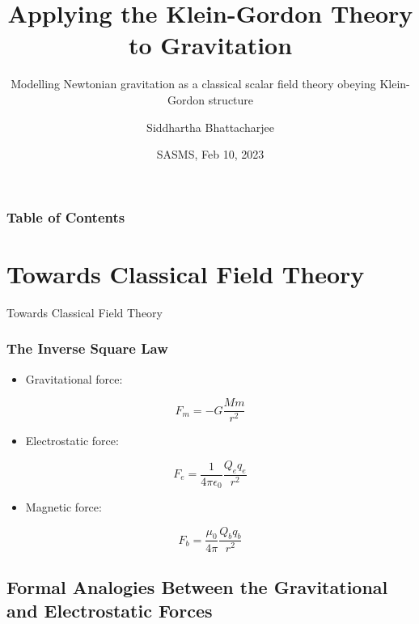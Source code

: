 \documentclass{beamer}
\title{Applying the Klein-Gordon Theory to Gravitation}
\subtitle{Modelling Newtonian gravitation as a classical scalar field theory obeying Klein-Gordon structure}
\author{Siddhartha Bhattacharjee}
\institute
{
1B Mathematical Physics \\
University of Waterloo
}
\date{SASMS, Feb 10, 2023}
\begin{document}
\frame{\titlepage}

\begin{frame}
\frametitle{Table of Contents}
\tableofcontents
\end{frame}

\section{Towards Classical Field Theory}

\begin{frame}
\begin{center}
\huge \textcolor{blue!50!gray}{Towards Classical Field Theory}
\end{center}
\end{frame}

\begin{frame}
\frametitle{The Inverse Square Law}

\begin{itemize}
\item Gravitational force:
\end{itemize}

$$F_m = - G \frac{M m}{r^2}$$

\begin{itemize}
\item Electrostatic force:
\end{itemize}

$$F_e = \frac{1}{4 \pi \epsilon_0} \frac{Q_e q_e}{r^2}$$

\begin{itemize}
\item Magnetic force:
\end{itemize}

$$F_b = \frac{\mu_0}{4 \pi} \frac{Q_b q_b}{r^2}$$
\end{frame}

\subsection{Formal Analogies Between the Gravitational and Electrostatic Forces}
\end{document}
